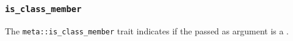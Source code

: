 
\subsubsection{\texttt{is\_class\_member}}

The \texttt{meta::is\_class\_member}
trait indicates if the  passed as argument is a .


